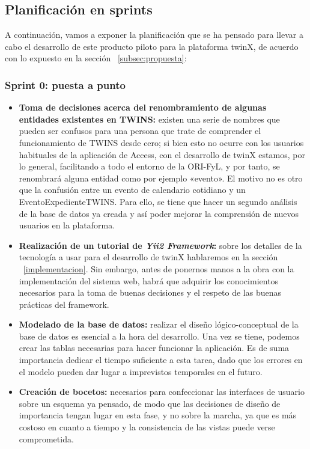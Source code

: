 \subsection{Planificación en sprints}
\label{subsec:sprints}

A continuación, vamos a exponer la planificación que se ha pensado para llevar a cabo el desarrollo de este producto piloto para la plataforma twinX, de acuerdo con lo expuesto en la sección ~\ref{subsec:propuesta}:

\subsubsection*{\textbf{Sprint 0: puesta a punto}}

\begin{itemize}
	\item \textbf{Toma de decisiones acerca del renombramiento de algunas entidades existentes en TWINS:} existen una serie de nombres que pueden ser confusos para una persona que trate de comprender el funcionamiento de TWINS desde cero; si bien esto no ocurre con los usuarios habituales de la aplicación de Access\textregistered, con el desarrollo de twinX estamos, por lo general, facilitando a todo el entorno de la ORI-FyL, y por tanto, se renombrará alguna entidad como por ejemplo «evento». El motivo no es otro que la confusión entre un evento de calendario cotidiano y un \gls{EventoExpedienteTWINS}. Para ello, se tiene que hacer un segundo análisis de la base de datos ya creada y así poder mejorar la comprensión de nuevos usuarios en la plataforma.
	\item \textbf{Realización de un tutorial de \textit{Yii2 Framework}:} sobre los detalles de la tecnología a usar para el desarrollo de twinX hablaremos en la sección ~\ref{implementacion}. Sin embargo, antes de ponernos manos a la obra con la implementación del sistema web, habrá que adquirir los conocimientos necesarios para la toma de buenas decisiones y el respeto de las buenas prácticas del framework. %
	\item \textbf{Modelado de la base de datos:} realizar el diseño lógico-conceptual de la base de datos es esencial a la hora del desarrollo. Una vez se tiene, podemos crear las tablas necesarias para hacer funcionar la aplicación. Es de suma importancia dedicar el tiempo suficiente a esta tarea, dado que los  errores en el modelo pueden dar lugar a imprevistos temporales en el futuro.
	\item \textbf{Creación de bocetos:} necesarios para confeccionar las interfaces de usuario sobre un esquema ya pensado, de modo que las decisiones de diseño de importancia tengan lugar en esta fase, y no sobre la marcha, ya que es más costoso en cuanto a tiempo y la consistencia de las vistas puede verse comprometida.	
\end{itemize}


